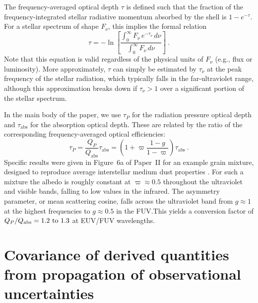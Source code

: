 \documentclass[useAMS, usenatbib, a4paper]{mnras}
\begin{document}
The frequency-averaged optical depth \(\tau\) is defined such that the
fraction of the frequency-integrated stellar radiative momentum
absorbed by the shell is \(1 - e^{-\tau}\).  For a stellar spectrum of
shape \(F_\nu\), this implies the formal relation
\begin{equation}
  \label{eq:tau-averaged}
  \tau = - \ln \left[ \frac{\int_0^\infty F_\nu \, e^{-\tau_\nu} \, d\nu}{\int_0^\infty F_\nu  \, d\nu} \right] \ .
\end{equation}
Note that this equation is valid regardless of the physical units of
\(F_\nu\) (e.g., flux or luminosity).  More approximately, \(\tau\) can
simply be estimated by \(\tau_\nu\) at the peak frequency of the stellar
radiation, which typically falls in the far-ultraviolet range,
although this approximation breaks down if \(\tau_\nu > 1\) over a
significant portion of the stellar spectrum.

In the main body of the paper, we use \(\tau_P\) for the radiation pressure
optical depth and \(\tau_{\text{abs}}\) for the absorption optical depth.  These are
related by the ratio of the corresponding frequency-averaged optical
efficiencies:
\begin{equation}
  \label{eq:tau_tauprime}
  \tau_P = \frac{Q_P}{Q_{\text{abs}}} \tau_{\text{abs}} = \left(  1 + \varpi \frac{1 - g}{1 - \varpi}\right) \tau_{\text{abs}}\ .
\end{equation}
Specific results were given in Figure~6a of Paper~II for an example
grain mixture, designed to reproduce average interstellar medium dust
properties \citep{Weingartner:2001b, Abel:2008a, Ferland:2013a,
  Ferland:2017a}.  For such a mixture the albedo is roughly constant
at \(\varpi \approx 0.5\) throughout the ultraviolet and visible bands,
falling to low values in the infrared.  The asymmetry parameter, or
mean scattering cosine, falls across the ultraviolet band from
\(g \approx 1\) at the highest frequencies to \(g\approx 0.5\) in the FUV.\@ This
yields a conversion factor of
\(Q_P / Q_{\text{abs}} = \text{\numrange{1.2}{1.3}}\) at EUV/FUV
wavelengths.  

\section{Covariance of derived quantities from propagation of observational uncertainties}
\label{sec:comb-uncert-covar}
\end{document}
